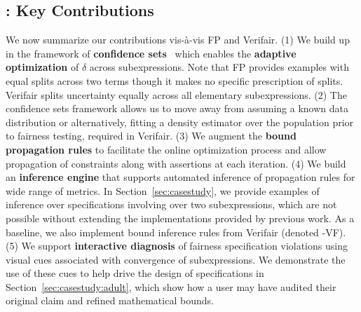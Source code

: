 \subsection{\AVOIRmethodname{}: Key Contributions}
\label{sec:contributions}

We now summarize our contributions vis-à-vis FP and Verifair.
(1) We build up \AVOIRmethodname{} in the framework of \textbf{confidence sets}~\citep{howard2021time} which enables the \textbf{adaptive optimization} of $\delta$ across subexpressions.
Note that FP provides examples with equal splits across two terms though it makes no specific prescription of splits.
Verifair splits uncertainty equally across all elementary subexpressions.
(2) The confidence sets framework allows us to move away from assuming a known data distribution or alternatively, fitting a density estimator over the population prior to fairness testing, required in Verifair.
(3) We augment the \textbf{bound propagation rules} to facilitate the online optimization process and allow propagation of constraints along with assertions at each iteration.
(4) We build an \textbf{inference engine} that supports automated inference of propagation rules for wide range of metrics.
In Section~\ref{sec:casestudy}, we provide examples of inference over specifications involving over two subexpressions, which are not possible without extending the implementations provided by previous work. 
As a baseline, we also implement bound inference rules from Verifair (denoted \AVOIRmethodname{}-VF).
(5) We support \textbf{interactive diagnosis} of fairness specification violations using visual cues associated with convergence of subexpressions.
We demonstrate the use of these cues to help drive the design of specifications in Section~\ref{sec:casestudy:adult}, which show how a user may have audited their original claim and refined mathematical bounds.
